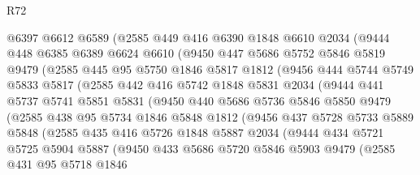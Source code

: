 \begin{lexlean}{R72}
\begin{coremodule}
        @6397
        @6612
        @6589
        (@2585
          @449
          @416
          @6390
          @1848
          @6610
          @2034
          (@9444
            @448
            @6385
            @6389
            @6624
            @6610
            (@9450
              @447
              @5686
              @5752
              @5846
              @5819
              @9479
              (@2585
                @445
                @95
                @5750
                @1846
                @5817
                @1812
                (@9456
                  @444
                  @5744
                  @5749
                  @5833
                  @5817
                  (@2585
                    @442
                    @416
                    @5742
                    @1848
                    @5831
                    @2034
                    (@9444
                      @441
                      @5737
                      @5741
                      @5851
                      @5831
                      (@9450
                        @440
                        @5686
                        @5736
                        @5846
                        @5850
                        @9479
                        (@2585
                          @438
                          @95
                          @5734
                          @1846
                          @5848
                          @1812
                          (@9456
                            @437
                            @5728
                            @5733
                            @5889
                            @5848
                            (@2585
                              @435
                              @416
                              @5726
                              @1848
                              @5887
                              @2034
                              (@9444
                                @434
                                @5721
                                @5725
                                @5904
                                @5887
                                (@9450
                                  @433
                                  @5686
                                  @5720
                                  @5846
                                  @5903
                                  @9479
                                  (@2585
                                    @431
                                    @95
                                    @5718
                                    @1846

\end{coremodule}
\end{lexlean}
